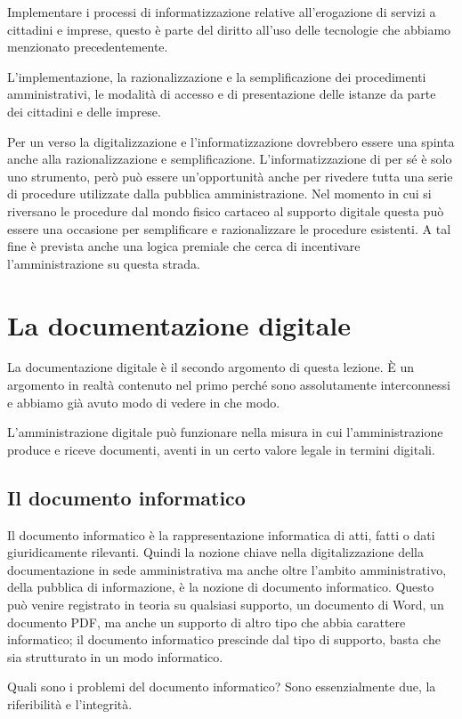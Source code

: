 Implementare i processi di informatizzazione relative all'erogazione di servizi a cittadini e imprese, questo è parte del diritto all'uso delle tecnologie che abbiamo menzionato precedentemente. 

L'implementazione, la razionalizzazione e la semplificazione dei procedimenti amministrativi, le modalità di accesso e di presentazione delle istanze da parte dei cittadini e delle imprese.

Per un verso la digitalizzazione e l'informatizzazione dovrebbero essere una spinta anche alla razionalizzazione e semplificazione. L'informatizzazione di per sé è solo uno strumento, però può essere un'opportunità anche per rivedere tutta una serie di procedure utilizzate dalla pubblica amministrazione. Nel momento in cui si riversano le procedure dal mondo fisico cartaceo al supporto digitale questa può essere una occasione per semplificare e razionalizzare le procedure esistenti. A tal fine è prevista anche una logica premiale che cerca di incentivare l'amministrazione su questa strada. 

\section{La documentazione digitale}
La documentazione digitale è il secondo argomento di questa lezione. È un argomento in realtà contenuto nel primo perché sono assolutamente interconnessi e abbiamo già avuto modo di vedere in che modo. 

L'amministrazione digitale può funzionare nella misura in cui l'amministrazione produce e riceve documenti, aventi in un certo valore legale in termini digitali. 

\subsection{Il documento informatico}
Il documento informatico è la rappresentazione informatica di atti, fatti o dati giuridicamente rilevanti. 
Quindi la nozione chiave nella digitalizzazione della documentazione in sede amministrativa ma anche oltre l'ambito amministrativo, della pubblica di informazione, è la nozione di documento informatico. 
Questo può venire registrato in teoria su qualsiasi supporto, un documento di Word, un documento PDF, ma anche un supporto di altro tipo che abbia carattere informatico; il documento informatico prescinde dal tipo di supporto, basta che sia strutturato in un modo informatico. 

Quali sono i problemi del documento informatico? Sono essenzialmente due, la riferibilità e l'integrità. 

